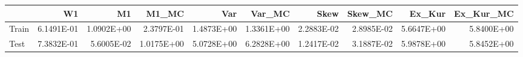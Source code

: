 \begin{tabular}{lrrrrrrrrr}
\toprule
{} &         W1 &         M1 &      M1\_MC &        Var &     Var\_MC &       Skew &    Skew\_MC &     Ex\_Kur &  Ex\_Kur\_MC \\
\midrule
Train & 6.1491E-01 & 1.0902E+00 & 2.3797E-01 & 1.4873E+00 & 1.3361E+00 & 2.2883E-02 & 2.8985E-02 & 5.6647E+00 & 5.8400E+00 \\
Test  & 7.3832E-01 & 5.6005E-02 & 1.0175E+00 & 5.0728E+00 & 6.2828E+00 & 1.2417E-02 & 3.1887E-02 & 5.9878E+00 & 5.8452E+00 \\
\bottomrule
\end{tabular}
